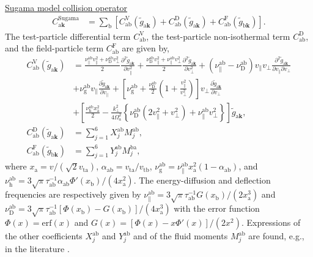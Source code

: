 \underline{Sugama model collision operator} \cite{Sugama2009PoP}\\
\begin{align}
  C_{\mathrm{a}\bm{k}}^\mathrm{Sugama} &= \sum_\mathrm{b} \left[ C^\mathrm{V}_\mathrm{ab}(\tilde{g}_{\mathrm{a}\bm{k}}) + C^\mathrm{D}_\mathrm{ab}(\tilde{g}_{\mathrm{a}\bm{k}}) + C^\mathrm{F}_\mathrm{ab}(\tilde{g}_{\mathrm{b}\bm{k}}) \right].
  \label{eq:Sugama_collision}
\end{align}
The test-particle differential term $C^\mathrm{V}_\mathrm{ab}$, the test-particle non-isothermal term $C^\mathrm{D}_\mathrm{ab}$, and the field-particle term $C^\mathrm{F}_\mathrm{ab}$ are given by,
\begin{align}
  C^\mathrm{V}_\mathrm{ab}(\tilde{g}_{\mathrm{a}\bm{k}}) &= \frac{\nu_\parallel^\mathrm{ab}v_\parallel^2+\nu_\mathrm{D}^\mathrm{ab}v_\perp^2}{2}\frac{\partial^2 \tilde{g}_{\mathrm{a}\bm{k}}}{\partial v_\parallel^2} + \frac{\nu_\mathrm{D}^\mathrm{ab}v_\parallel^2+\nu_\parallel^\mathrm{ab}v_\perp^2}{2}\frac{\partial^2 \tilde{g}_{\mathrm{a}\bm{k}}}{\partial v_\perp^2} + (\nu_\parallel^\mathrm{ab}-\nu_\mathrm{D}^\mathrm{ab})v_\parallel v_\perp \frac{\partial^2 \tilde{g}_{\mathrm{a}\bm{k}}}{\partial v_\parallel \partial v_\perp} \nonumber \\
  &+ \nu_\mathrm{g}^\mathrm{ab} v_\parallel \frac{\partial \tilde{g}_{\mathrm{a}\bm{k}}}{\partial v_\parallel} + \left[ \nu_\mathrm{g}^\mathrm{ab} + \frac{\nu_\mathrm{D}^\mathrm{ab}}{2} \left( 1 + \frac{v_\parallel^2}{v_\perp^2} \right) \right] v_\perp \frac{\partial \tilde{g}_{\mathrm{a}\bm{k}}}{\partial v_\perp} \nonumber \\
  &+\left[ \frac{\nu_\mathrm{h}^\mathrm{ab} x_\mathrm{a}^2}{2} - \frac{k_\perp^2}{4\Omega_\mathrm{a}^2} \left\{ \nu_\mathrm{D}^\mathrm{ab} (2v_\parallel^2 + v_\perp^2) + \nu_\parallel^\mathrm{ab} v_\perp^2 \right\} \right] \tilde{g}_{\mathrm{a}\bm{k}}, \\
  C^\mathrm{D}_\mathrm{ab}(\tilde{g}_{\mathrm{a}\bm{k}}) &= \sum_{j=1}^6 X_j^\mathrm{ab} M_j^\mathrm{ab}, \\ 
  C^\mathrm{F}_\mathrm{ab}(\tilde{g}_{\mathrm{b}\bm{k}}) &= \sum_{j=1}^6 Y_j^\mathrm{ab} M_j^\mathrm{ba},
\end{align}
where $x_\mathrm{a} = v / (\sqrt{2}v_\mathrm{ta})$, $\alpha_\mathrm{ab}=v_\mathrm{ta}/v_\mathrm{tb}$, $\nu_\mathrm{g}^\mathrm{ab} = \nu_\parallel^\mathrm{ab}x_\mathrm{a}^2(1-\alpha_\mathrm{ab})$, and $\nu_\mathrm{h}^\mathrm{ab} = 3\sqrt{\pi}\tau^{-1}_\mathrm{ab}\alpha_\mathrm{ab}\Phi'(x_\mathrm{b})/(4x_\mathrm{a}^2)$. The energy-diffusion and deflection frequencies are respectively given by $\nu_\parallel^\mathrm{ab} = 3\sqrt{\pi}\tau^{-1}_\mathrm{ab}G(x_\mathrm{b})/(2x_\mathrm{a}^3)$ and $\nu_\mathrm{D}^\mathrm{ab} = 3\sqrt{\pi}\tau^{-1}_\mathrm{ab}[\Phi(x_\mathrm{b})-G(x_\mathrm{b})]/(4x_\mathrm{a}^3)$ with the error function $\Phi(x) = \mathrm{erf}(x)$ and $G(x) = [\Phi(x) - x \Phi'(x)]/(2x^2)$. Expressions of the other coefficients $X_j^\mathrm{ab}$ and $Y_j^\mathrm{ab}$ and of the fluid moments $M_j^\mathrm{ab}$ are found, e.g., in the literature \cite{Nakata2015CPC}.




